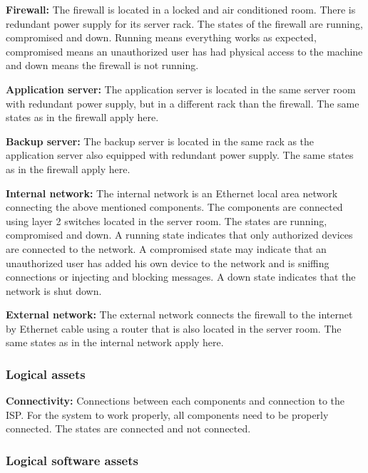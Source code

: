 \documentclass[english]{article}
\begin{document}
	\begin{description}
		\item{\textbf{Firewall:}} The firewall is located in a locked and air conditioned room. There is redundant power supply for its server rack. The states of the firewall are running, compromised and down. Running means everything works as expected, compromised means an unauthorized user has had physical access to the machine and down means the firewall is not running.
		\item{\textbf{Application server:}} The application server is located in the same server room with redundant power supply, but in a different rack than the firewall. The same states as in the firewall apply here.
		\item{\textbf{Backup server:}} The backup server is located in the same rack as the application server also equipped with redundant power supply. The same states as in the firewall apply here.
		\item{\textbf{Internal network:}} The internal network is an Ethernet local area network connecting the above mentioned components. The components are connected using layer 2 switches located in the server room. The states are running, compromised and down. A running state indicates that only authorized devices are connected to the network. A compromised state may indicate that an unauthorized user has added his own device to the network and is sniffing connections or injecting and blocking messages. A down state indicates that the network is shut down.
		\item{\textbf{External network:}} The external network connects the firewall to the internet by Ethernet cable using a router that is also located in the server room. The same states as in the internal network apply here.
	\end{description}


\subsubsection{Logical assets}
	\begin{description}
		\item{\textbf{Connectivity:}} Connections between each components and connection to the ISP. For the system to work properly, all components need to be properly connected. The states are connected and not connected.
	\end{description}

\subsubsection{Logical software assets}
\end{document}
